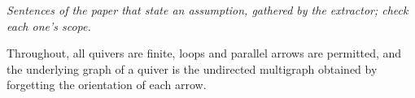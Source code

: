 \begin{theorem}\label{Arden24-setup}
\emph{Sentences of the paper that state an assumption, gathered by the extractor; check each one's scope.}

Throughout, all quivers are finite, loops and parallel arrows are permitted, and the underlying graph of a quiver is the undirected multigraph obtained by forgetting the orientation of each arrow.
\end{theorem}